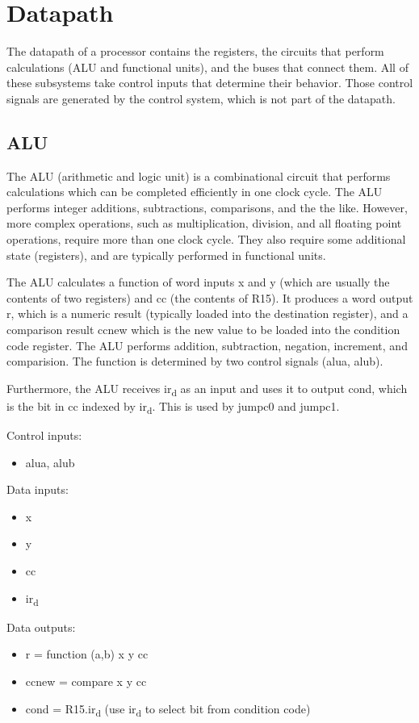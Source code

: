 \documentclass[11pt]{article}
\begin{document}
\section{Datapath}
\label{sec:org89ea49c}

The datapath of a processor contains the registers, the circuits that
perform calculations (ALU and functional units), and the buses that
connect them.  All of these subsystems take control inputs that
determine their behavior.  Those control signals are generated by the
control system, which is not part of the datapath.

\subsection{ALU}
\label{sec:org2ff0a37}

The ALU (arithmetic and logic unit) is a combinational circuit that
performs calculations which can be completed efficiently in one clock
cycle.  The ALU performs integer additions, subtractions, comparisons,
and the the like.  However, more complex operations, such as
multiplication, division, and all floating point operations, require
more than one clock cycle.  They also require some additional state
(registers), and are typically performed in functional units.


The ALU calculates a function of word inputs x and y (which are
usually the contents of two registers) and cc (the contents of R15).
It produces a word output r, which is a numeric result (typically
loaded into the destination register), and a comparison result ccnew
which is the new value to be loaded into the condition code register.
The ALU performs addition, subtraction, negation, increment, and
comparision.  The function is determined by two control signals (alua,
alub).

Furthermore, the ALU receives ir\textsubscript{d} as an input and uses it to output
cond, which is the bit in cc indexed by ir\textsubscript{d}.  This is used by jumpc0
and jumpc1.

Control inputs:
\begin{itemize}
\item alua, alub
\end{itemize}
Data inputs:
\begin{itemize}
\item x
\item y
\item cc
\item ir\textsubscript{d}
\end{itemize}
Data outputs:
\begin{itemize}
\item r      = function (a,b) x y cc
\item ccnew  = compare x y cc
\item cond   = R15.ir\textsubscript{d}  (use ir\textsubscript{d} to select bit from condition code)
\end{itemize}
\end{document}

